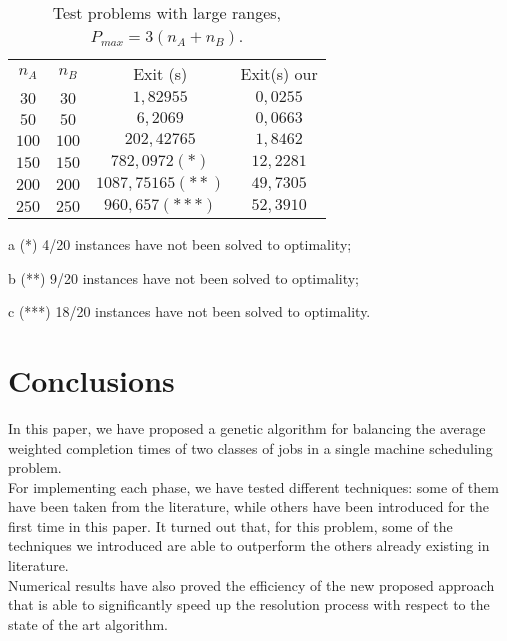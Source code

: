 \documentclass[opre,nonblindrev]{informs3} %
\begin{document}
\begin{table}[h]\scriptsize
	\begin{center}
		\begin{tabular}{|| c | c|| c||c ||}\hline
			
			 \multirow{3}{*}{$n_A$} & \multirow{3}{*}{$n_B$} & \multirow{3}{*}{Exit (s)} & \multirow{3}{*}{Exit(s) our}\\
		  &&  & \\
		    &    & &\\\hline
		 $30$   & $30$   &$1,82955
		 $
			& $0,0255$
			\\ \hline
		$50$ & $50$	 &$6,2069
		$
			&$0,0663$
			\\ \hline
			
		 $100$   & $100$   &$ 202,42765
		 $
			&$1,8462$
			\\ \hline
		  $150$& $150$	 &$782,0972
		  (*)$
			&$12,2281$
			\\ \hline
			
		 $200$   & $200$   &  $1087,75165
		 (**)$
			&$49,7305$
			\\ \hline
			 $250$   & $250$   &  $960,657
			 (***)$
			&$52,3910$
			\\ \hline
		\end{tabular}
	\caption{Test problems with large ranges, $P_{max} = 3(n_A+n_B)$.} \label{largex}
		\begin{tablenotes}
			\item[a] 	(*) 4/20 instances have not been solved to optimality;
			\item[b]	(**) 9/20 instances have not been solved to optimality;
			\item[c]	(***) 18/20 instances have not been solved to optimality.
		\end{tablenotes}
	\end{center}



\end{table}

\section{Conclusions}
In this paper, we have proposed a genetic algorithm for balancing the average weighted completion times of two classes of jobs in a single machine scheduling problem.\\ For implementing each phase, we have tested different techniques: some of them have been taken from the literature, while others have been introduced for the first time in this paper. It turned out that, for this problem, some of the techniques we introduced are able to outperform the others already existing in literature.\\
Numerical results have also proved the efficiency of the new proposed approach that is able to significantly speed up the resolution process with respect to the state of the art algorithm. 



 

\end{document}
